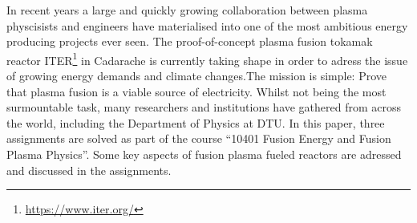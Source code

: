 In recent years a large and quickly growing collaboration between plasma physcisists and engineers have materialised into one of the most ambitious energy producing projects ever seen. The proof-of-concept plasma fusion tokamak reactor ITER\footnote{\url{https://www.iter.org/}} in Cadarache is currently taking shape in order to adress the issue of growing energy demands and climate changes.\newline The mission is simple: Prove that plasma fusion is a viable source of electricity.\newline
Whilst not being the most surmountable task, many researchers and institutions have gathered from across the world, including the Department of Physics at DTU.\newline
In this paper, three assignments are solved as part of the course ``10401 Fusion Energy and Fusion Plasma Physics''. Some key aspects of fusion plasma fueled reactors are adressed and discussed in the assignments.
